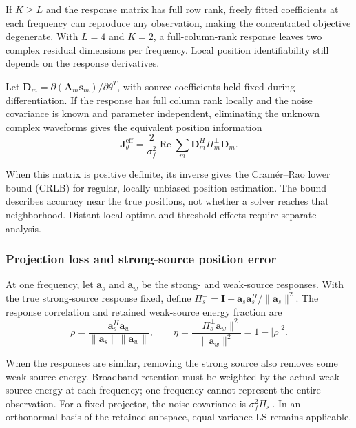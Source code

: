 \documentclass[11pt,a4paper]{article}
\numberwithin{equation}{section}
\numberwithin{figure}{section}
\numberwithin{table}{section}
\begin{document}
If $K\geq L$ and the response matrix has full row rank, freely fitted coefficients at each frequency can reproduce any observation, making the concentrated objective degenerate. With $L=4$ and $K=2$, a full-column-rank response leaves two complex residual dimensions per frequency. Local position identifiability still depends on the response derivatives.

Let $\mathbf{D}_m=\partial(\mathbf{A}_m\mathbf{s}_m)/\partial\theta^T$, with source coefficients held fixed during differentiation. If the response has full column rank locally and the noise covariance is known and parameter independent, eliminating the unknown complex waveforms gives the equivalent position information\cite{ref05,ref10}
\begin{equation}\label{eq:2.14}
\boxed{ \mathbf{J}_\theta^{\mathrm{eff}} = \frac{2}{\sigma_f^2} \operatorname{Re} \sum_m \mathbf{D}_m^H\Pi_m^\perp\mathbf{D}_m }.
\end{equation}

When this matrix is positive definite, its inverse gives the Cram\'er--Rao lower bound (CRLB) for regular, locally unbiased position estimation. The bound describes accuracy near the true positions, not whether a solver reaches that neighborhood. Distant local optima and threshold effects require separate analysis\cite{ref11}.

\subsubsection{Projection loss and strong-source position error}\label{sec:2.5.2}

At one frequency, let $\mathbf{a}_s$ and $\mathbf{a}_w$ be the strong- and weak-source responses. With the true strong-source response fixed, define $\Pi_s^\perp=\mathbf{I}-\mathbf{a}_s\mathbf{a}_s^H/\|\mathbf{a}_s\|^2$. The response correlation and retained weak-source energy fraction are
\begin{equation}\label{eq:2.15}
\rho =\frac{\mathbf{a}_s^H\mathbf{a}_w}{\|\mathbf{a}_s\|\|\mathbf{a}_w\|}, \qquad \eta =\frac{\|\Pi_s^\perp\mathbf{a}_w\|^2}{\|\mathbf{a}_w\|^2} =1-|\rho|^2.
\end{equation}

When the responses are similar, removing the strong source also removes some weak-source energy. Broadband retention must be weighted by the actual weak-source energy at each frequency; one frequency cannot represent the entire observation. For a fixed projector, the noise covariance is $\sigma_f^2\Pi_s^\perp$. In an orthonormal basis of the retained subspace, equal-variance LS remains applicable.
\end{document}

